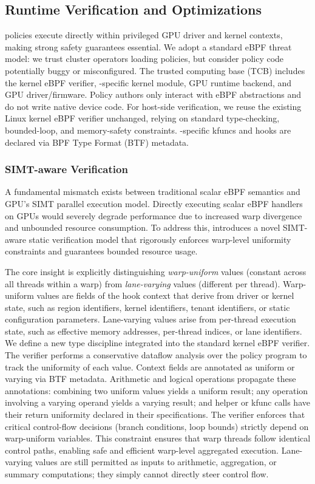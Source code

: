 \subsection{Runtime Verification and Optimizations}
\label{sec:verification}

\sys policies execute directly within privileged GPU driver and kernel contexts, making strong safety guarantees essential. We adopt a standard eBPF threat model: we trust cluster operators loading policies, but consider policy code potentially buggy or misconfigured. The trusted computing base (TCB) includes the kernel eBPF verifier, \sys-specific kernel module, GPU runtime backend, and GPU driver/firmware. Policy authors only interact with eBPF abstractions and do not write native device code. For host-side verification, we reuse the existing Linux kernel eBPF verifier unchanged, relying on standard type-checking, bounded-loop, and memory-safety constraints. \sys-specific kfuncs and hooks are declared via BPF Type Format (BTF) metadata.

\subsubsection{SIMT-aware Verification}

A fundamental mismatch exists between traditional scalar eBPF semantics and GPU's SIMT parallel execution model. Directly executing scalar eBPF handlers on GPUs would severely degrade performance due to increased warp divergence and unbounded resource consumption. To address this, \sys introduces a novel SIMT-aware static verification model that rigorously enforces warp-level uniformity constraints and guarantees bounded resource usage.

The core insight is explicitly distinguishing \emph{warp-uniform} values (constant across all threads within a warp) from \emph{lane-varying} values (different per thread). Warp-uniform values are fields of the hook context that derive from driver or kernel state, such as region identifiers, kernel identifiers, tenant identifiers, or static configuration parameters. Lane-varying values arise from per-thread execution state, such as effective memory addresses, per-thread indices, or lane identifiers. We define a new type discipline integrated into the standard kernel eBPF verifier. The verifier performs a conservative dataflow analysis over the policy program to track the uniformity of each value. Context fields are annotated as uniform or varying via BTF metadata. Arithmetic and logical operations propagate these annotations: combining two uniform values yields a uniform result; any operation involving a varying operand yields a varying result; and helper or kfunc calls have their return uniformity declared in their specifications. The verifier enforces that critical control-flow decisions (branch conditions, loop bounds) strictly depend on warp-uniform variables. This constraint ensures that warp threads follow identical control paths, enabling safe and efficient warp-level aggregated execution. Lane-varying values are still permitted as inputs to arithmetic, aggregation, or summary computations; they simply cannot directly steer control flow.

